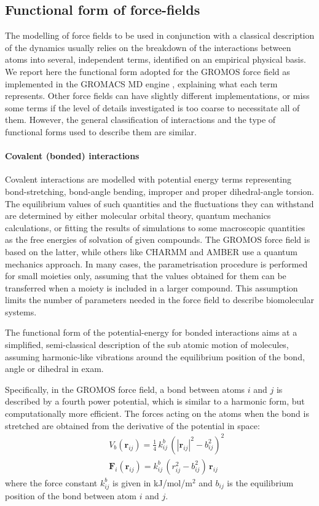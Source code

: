 \subsection{Functional form of force-fields} \label{sec:ff}

The modelling of force fields to be used in conjunction with a classical description of the dynamics usually relies on the breakdown of the interactions between atoms into several, independent terms, identified on an empirical physical basis. We report here the functional form adopted for the GROMOS force field \cite{--} as implemented in the GROMACS MD engine \cite{--}, explaining what each term represents. Other force fields can have slightly different implementations, or miss some terms if the level of details investigated is too coarse to necessitate all of them. However, the general classification of interactions and the type of functional forms used to describe them are similar.

\paragraph{Covalent (bonded) interactions} Covalent interactions are modelled with potential energy terms representing bond-stretching, bond-angle bending, improper and proper dihedral-angle torsion. The equilibrium values of such quantities and the fluctuations they can withstand are determined by either molecular orbital theory, quantum mechanics calculations, or fitting the results of simulations to some macroscopic quantities as the free energies of solvation of given compounds. The GROMOS force field is based on the latter, while others like CHARMM \cite{--} and AMBER \cite{--} use a quantum mechanics approach.
%
In many cases, the parametrisation procedure is performed for small moieties only, assuming that the values obtained for them can be transferred when a moiety is included in a larger compound. This assumption limits the number of parameters needed in the force field to describe biomolecular systems.

The functional form of the potential-energy for bonded interactions aims at a simplified, semi-classical description of the sub atomic motion of molecules, assuming harmonic-like vibrations around the equilibrium position of the bond, angle or dihedral in exam.

Specifically, in the GROMOS force field, a bond between atoms $i$ and $j$ is described by a fourth power potential, which is similar to a harmonic form, but computationally more efficient. The forces acting on the atoms when the bond is stretched are obtained from the derivative of the potential in space:
\begin{eqnarray}
&& V_b(\textbf{r}_{ij}) = \frac{1}{4}\,k^b_{ij}\,\left(|\textbf{r}_{ij}|^2 - b_{ij}^2\right)^2 \\
&& \textbf{F}_i(\textbf{r}_{ij}) = k^b_{ij}\,\left(r_{ij}^2 - b_{ij}^2\right)\,\textbf{r}_{ij}
\end{eqnarray}
where the force constant $k^b_{ij}$ is given in kJ/mol/m$^2$ and $b_{ij}$ is the equilibrium position of the bond between atom $i$ and $j$.

